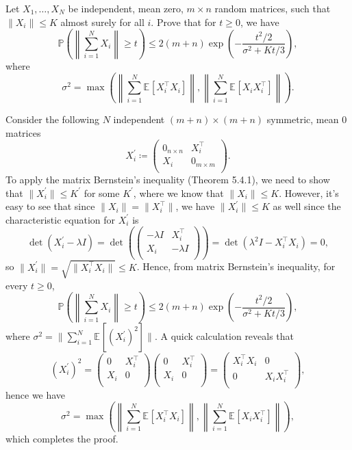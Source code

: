 \begin{problem*}[Exercise 5.4.15]\label{ex5.4.15}
	Let \(X_1, \dots , X_N\) be independent, mean zero, \(m \times n\) random matrices, such that \(\lVert X_i \rVert \leq K\) almost surely for all \(i\). Prove that for \(t \geq 0\), we have
	\[
		\mathbb{P} \left( \left\lVert \sum_{i=1}^{N} X_i \right\rVert \geq t \right)
		\leq 2 (m+n) \exp (- \frac{t^2 / 2}{\sigma ^2 + Kt / 3}),
	\]
	where
	\[
		\sigma ^2
		= \max \left( \left\lVert \sum_{i=1}^{N} \mathbb{E}_{}[X_i ^{\top} X_i] \right\rVert , \left\lVert \sum_{i=1}^{N} \mathbb{E}_{}[X_i X_i ^{\top} ] \right\rVert \right) .
	\]
\end{problem*}
\begin{answer}
	Consider the following \(N\) independent \((m+n) \times (m+n)\) symmetric, mean \(0\) matrices
	\[
		X_i^{\prime} \coloneqq \begin{pmatrix}
			0_{n\times n} & X_i ^{\top}    \\
			X_i           & 0_{m \times m} \\
		\end{pmatrix}.
	\]
	To apply the matrix Bernstein's inequality (Theorem 5.4.1), we need to show that \(\lVert X_i ^{\prime} \rVert \leq K^{\prime} \) for some \(K^{\prime} \), where we know that \(\lVert X_i \rVert \leq K\). However, it's easy to see that since \(\lVert X_i \rVert = \lVert X_i ^{\top} \rVert \), we have \(\lVert X_i^{\prime} \rVert \leq K\) as well since the characteristic equation for \(X_i ^{\prime} \) is
	\[
		\det (X_i^{\prime} - \lambda I)
		= \det (\begin{pmatrix}
				-\lambda I & X_i ^{\top} \\
				X_i        & -\lambda I  \\
			\end{pmatrix} )
		= \det (\lambda ^2 I - X_i ^{\top} X_i)
		= 0,
	\]
	so \(\lVert X_i^{\prime} \rVert = \sqrt{\lVert X_i ^{\top} X_i \rVert } \leq K\). Hence, from matrix Bernstein's inequality, for every \(t \geq 0\),
	\[
		\mathbb{P} \left( \left\lVert \sum_{i=1}^{N} X_i \right\rVert \geq t \right)
		\leq 2 (m+n) \exp (- \frac{t^2 / 2}{\sigma ^2 + Kt / 3}),
	\]
	where \(\sigma ^2 = \lVert \sum_{i=1}^{N} \mathbb{E}_{}[(X_i ^{\prime}) ^2] \rVert \). A quick calculation reveals that
	\[
		(X_i^{\prime} )^2
		= \begin{pmatrix}
			0   & X_i ^{\top} \\
			X_i & 0           \\
		\end{pmatrix}\begin{pmatrix}
			0   & X_i ^{\top} \\
			X_i & 0           \\
		\end{pmatrix}
		= \begin{pmatrix}
			X_i ^{\top} X_i & 0               \\
			0               & X_i X_i ^{\top} \\
		\end{pmatrix},
	\]
	hence we have
	\[
		\sigma ^2
		= \max \left( \left\lVert \sum_{i=1}^{N} \mathbb{E}_{}[X_i ^{\top} X_i] \right\rVert , \left\lVert \sum_{i=1}^{N} \mathbb{E}_{}[X_i X_i ^{\top} ] \right\rVert \right),
	\]
	which completes the proof.
\end{answer}
